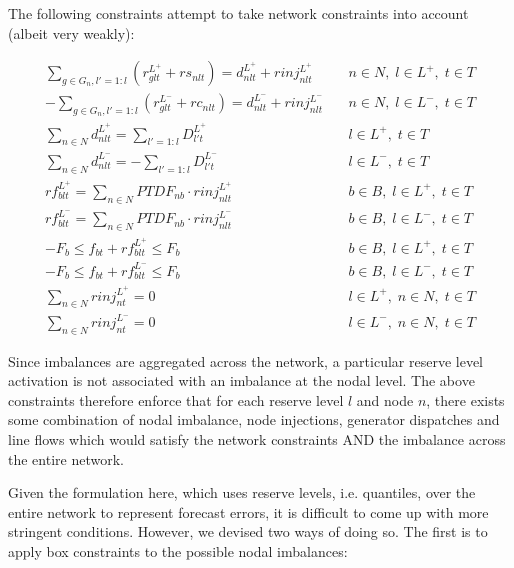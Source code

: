 \documentclass[number,times]{elsarticle}
\begin{document}
The following constraints attempt to take network constraints into account (albeit very weakly):

\begin{align}
    \sum_{g \in G_n, l'=1:l} (r^{L^+}_{glt} + rs_{nlt}) = d^{L^+}_{nlt} + rinj^{L^+}_{nlt}   & \quad n \in N, \; l \in L^+, \; t \in T \\
    - \sum_{g \in G_n, l'=1:l} (r^{L^-}_{glt} + rc_{nlt}) = d^{L^-}_{nlt} + rinj^{L^-}_{nlt} & \quad n \in N, \; l \in L^-, \; t \in T \\
    \sum_{n \in N} d^{L^+}_{nlt} = \sum_{l'=1:l} D^{L^+}_{l't}                               & \quad l \in L^+, \; t \in T             \\
    \sum_{n \in N} d^{L^-}_{nlt} = - \sum_{l'=1:l} D^{L^-}_{l't}                             & \quad l \in L^-, \; t \in T             \\
    rf^{L^+}_{blt} = \sum_{n \in N} PTDF_{nb} \cdot rinj^{L^+}_{nlt}                         & \quad b \in B, \; l \in L^+, \; t \in T \\
    rf^{L^-}_{blt} = \sum_{n \in N} PTDF_{nb} \cdot rinj^{L^-}_{nlt}                         & \quad b \in B, \; l \in L^-, \; t \in T \\
    -F_{b} \leq f_{bt} + rf^{L^+}_{blt} \leq F_b                                             & \quad b \in B, \; l \in L^+, \; t \in T \\
    -F_{b} \leq f_{bt} + rf^{L^-}_{blt} \leq F_b                                             & \quad b \in B, \; l \in L^-, \; t \in T \\
    \sum_{n \in N} rinj^{L^+}_{nt} = 0                                                       & \quad l \in L^+, \; n \in N, \; t \in T \\
    \sum_{n \in N} rinj^{L^-}_{nt} = 0                                                       & \quad l \in L^-, \; n \in N, \; t \in T
\end{align}

Since imbalances are aggregated across the network, a particular reserve level activation is not associated with an imbalance at the nodal level. The above constraints therefore enforce that for each reserve level $l$ and node $n$, there exists some combination of nodal imbalance, node injections, generator dispatches and line flows which would satisfy the network constraints AND the imbalance across the entire network. 

Given the formulation here, which uses reserve levels, i.e. quantiles, over the entire network to represent forecast errors, it is difficult to come up with more stringent conditions. However, we devised two ways of doing so. The first is to apply box constraints to the possible nodal imbalances:
\end{document}
